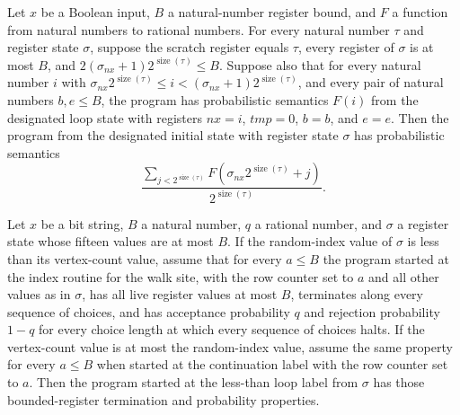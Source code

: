 \begin{lemma}
\label{Complexity.LogProg.ups_coin}
\leanok
{}
Let $x$ be a Boolean input, $B$ a natural-number register bound, and $F$ a function from
natural numbers to rational numbers. For every natural number $\tau$ and register state
$\sigma$, suppose the scratch register equals $\tau$, every register of $\sigma$ is at
most $B$, and $2(\sigma_{nx}+1)2^{\operatorname{size}(\tau)}\le B$. Suppose also that
for every natural number $i$ with $\sigma_{nx}2^{\operatorname{size}(\tau)}\le
i<(\sigma_{nx}+1)2^{\operatorname{size}(\tau)}$, and every pair of natural numbers
$b,e\le B$, the program has probabilistic semantics $F(i)$ from the designated loop
state with registers $nx=i$, $tmp=0$, $b=b$, and $e=e$. Then the program from the
designated initial state with register state $\sigma$ has probabilistic semantics
$$\frac{\sum_{j<2^{\operatorname{size}(\tau)}}F(\sigma_{nx}2^{\operatorname{size}(\tau)}+j)}{2^{\operatorname{size}(\tau)}}.$$
\end{lemma}

\begin{lemma}
\label{Complexity.LogProg.ups_lt}
\leanok
{}
Let $x$ be a bit string, $B$ a natural number, $q$ a rational number, and $\sigma$ a
register state whose fifteen values are at most $B$. If the random-index value of
$\sigma$ is less than its vertex-count value, assume that for every $a\le B$ the program
started at the index routine for the walk site, with the row counter set to $a$ and all
other values as in $\sigma$, has all live register values at most $B$, terminates along
every sequence of choices, and has acceptance probability $q$ and rejection probability
$1-q$ for every choice length at which every sequence of choices halts. If the
vertex-count value is at most the random-index value, assume the same property for every
$a\le B$ when started at the continuation label with the row counter set to $a$. Then
the program started at the less-than loop label from $\sigma$ has those bounded-register
termination and probability properties.
\end{lemma}


